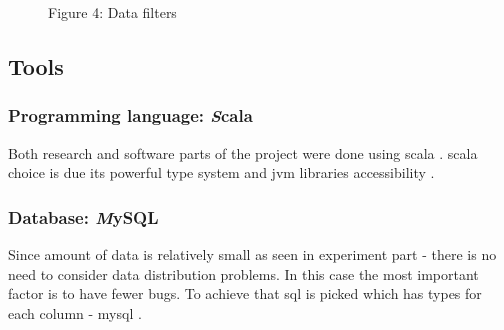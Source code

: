 \documentclass[a4paper,12pt]{article}
\begin{document}
	\begin{figure}[!tbp]
		\centering
		\hfill
		\hfill
		\caption{Figure 4: Data filters}
	\end{figure}
	
	\clearpage
	
	\subsection{Tools}
	\subsubsection{Programming language: {\textit Scala}}
	
	Both research and software parts of the project were done using \gls{scala} \cite{scala_lang}. \Gls{scala} choice is due its powerful type system and \gls{jvm} libraries accessibility \cite{scala_in_depth}. 
	
	\subsubsection{Database: {\textit MySQL}}
	
	Since amount of data is relatively small as seen in experiment part - there is no need to consider data distribution problems. In this case the most important factor is to have fewer bugs. To achieve that \acrfull{sql} is picked which has types for each column - \gls{mysql} \cite{mysql_lang}.
	
\end{document}

